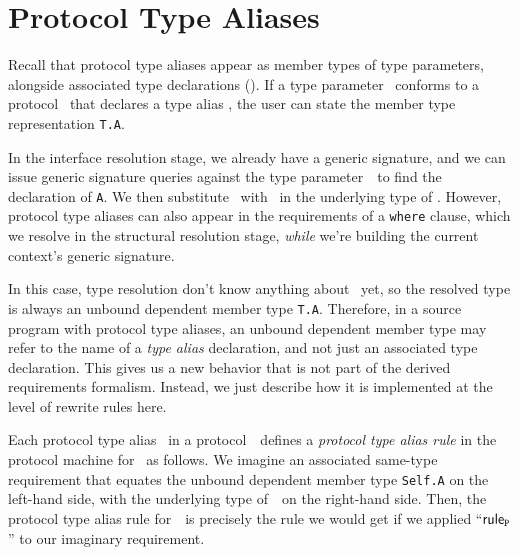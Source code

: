 \documentclass[../generics]{subfiles}
\begin{document}
\section{Protocol Type Aliases}\label{sec:protocol type aliases}

Recall that protocol type aliases appear as member types of type parameters, alongside associated type declarations (). If a type parameter \tT\ conforms to a protocol \tP\ that declares a type alias \nA, the user can state the member type representation \texttt{T.A}.

In the interface resolution stage, we already have a generic signature, and we can issue generic signature queries against the type parameter~\tT\ to find the declaration of \texttt{A}. We then substitute \tSelf\ with \tT\ in the underlying type of \nA. However, protocol type aliases can also appear in the requirements of a \texttt{where} clause, which we resolve in the structural resolution stage, \emph{while} we're building the current context's generic signature.

In this case, type resolution don't know anything about \tT\ yet, so the resolved type is always an unbound dependent member type \texttt{T.A}. Therefore, in a source program with protocol type aliases, an unbound dependent member type may refer to the name of a \emph{type alias} declaration, and not just an associated type declaration. This gives us a new behavior that is not part of the derived requirements formalism. Instead, we just describe how it is implemented at the level of rewrite rules here.

Each protocol type alias \nA\ in a protocol~\tP\ defines a \emph{protocol type alias rule} in the protocol machine for \tP\ as follows. We imagine an associated same-type requirement that equates the unbound dependent member type \texttt{Self.A} on the left-hand side, with the underlying type of~\nA\  on the right-hand side. Then, the protocol type alias rule for~\nA\ is precisely the rule we would get if we applied ``$\mathsf{rule}_{\texttt{P}}$'' to our imaginary requirement.
\end{document}
